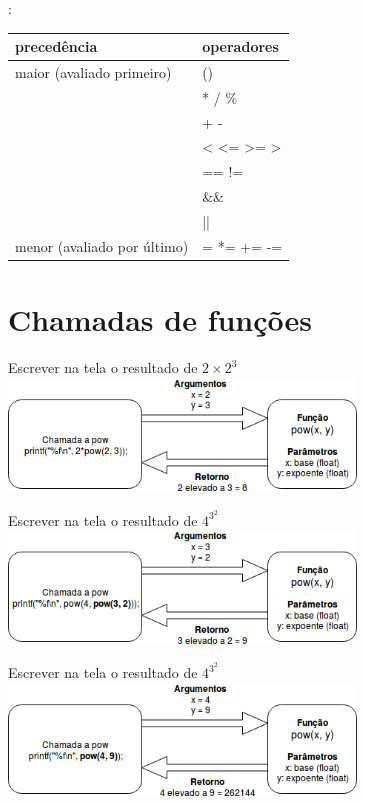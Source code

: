 \documentclass[portuguese,10pt,xcolor=table]{beamer}
\begin{document}
	\begin{frame}
	:
		
    	\begin{tabular}{|l|l|}
    		\hline
			precedência & operadores \\\hline
			maior (avaliado primeiro) & ()\\
			& * / \%\\
			& + - \\
			& < <= >= > \\
			& == != \\
			& \&\& \\
			& || \\
			menor (avaliado por último) & = *= += -= \\\hline
    	\end{tabular}
	\end{frame}

\section{Chamadas de funções}

	\begin{frame}
		Escrever na tela o resultado de $2 \times 2^3$\\
			\includegraphics[height=3.0cm]{funcao1.png}\\
	\end{frame} 
	\begin{frame}
		Escrever na tela o resultado de $4^{3^2}$\\
			\includegraphics[height=3.0cm]{funcao2.png}\\
	\end{frame} 
	\begin{frame}
		Escrever na tela o resultado de $4^{3^2}$\\
			\includegraphics[height=3.0cm]{funcao3.png}\\
	\end{frame} 
\end{document}

